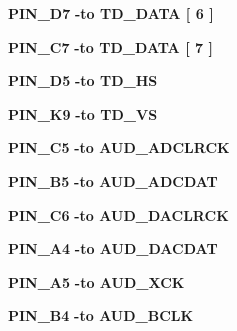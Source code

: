 \begin{DoxyCompactItemize}
\item 
{\bf P\+I\+N\+\_\+\+D7} {\bfseries \textcolor{vhdlchar}{-\/}\textcolor{keywordflow}{to}\textcolor{vhdlchar}{ }\textcolor{vhdlchar}{T\+D\+\_\+\+D\+A\+TA}\textcolor{vhdlchar}{ }\textcolor{vhdlchar}{[}\textcolor{vhdlchar}{ } \textcolor{vhdldigit}{6} \textcolor{vhdlchar}{ }\textcolor{vhdlchar}{]}\textcolor{vhdlchar}{ }} 
\item 
{\bf P\+I\+N\+\_\+\+C7} {\bfseries \textcolor{vhdlchar}{-\/}\textcolor{keywordflow}{to}\textcolor{vhdlchar}{ }\textcolor{vhdlchar}{T\+D\+\_\+\+D\+A\+TA}\textcolor{vhdlchar}{ }\textcolor{vhdlchar}{[}\textcolor{vhdlchar}{ } \textcolor{vhdldigit}{7} \textcolor{vhdlchar}{ }\textcolor{vhdlchar}{]}\textcolor{vhdlchar}{ }} 
\item 
{\bf P\+I\+N\+\_\+\+D5} {\bfseries \textcolor{vhdlchar}{-\/}\textcolor{keywordflow}{to}\textcolor{vhdlchar}{ }\textcolor{vhdlchar}{T\+D\+\_\+\+HS}\textcolor{vhdlchar}{ }} 
\item 
{\bf P\+I\+N\+\_\+\+K9} {\bfseries \textcolor{vhdlchar}{-\/}\textcolor{keywordflow}{to}\textcolor{vhdlchar}{ }\textcolor{vhdlchar}{T\+D\+\_\+\+VS}\textcolor{vhdlchar}{ }} 
\item 
{\bf P\+I\+N\+\_\+\+C5} {\bfseries \textcolor{vhdlchar}{-\/}\textcolor{keywordflow}{to}\textcolor{vhdlchar}{ }\textcolor{vhdlchar}{A\+U\+D\+\_\+\+A\+D\+C\+L\+R\+CK}\textcolor{vhdlchar}{ }} 
\item 
{\bf P\+I\+N\+\_\+\+B5} {\bfseries \textcolor{vhdlchar}{-\/}\textcolor{keywordflow}{to}\textcolor{vhdlchar}{ }\textcolor{vhdlchar}{A\+U\+D\+\_\+\+A\+D\+C\+D\+AT}\textcolor{vhdlchar}{ }} 
\item 
{\bf P\+I\+N\+\_\+\+C6} {\bfseries \textcolor{vhdlchar}{-\/}\textcolor{keywordflow}{to}\textcolor{vhdlchar}{ }\textcolor{vhdlchar}{A\+U\+D\+\_\+\+D\+A\+C\+L\+R\+CK}\textcolor{vhdlchar}{ }} 
\item 
{\bf P\+I\+N\+\_\+\+A4} {\bfseries \textcolor{vhdlchar}{-\/}\textcolor{keywordflow}{to}\textcolor{vhdlchar}{ }\textcolor{vhdlchar}{A\+U\+D\+\_\+\+D\+A\+C\+D\+AT}\textcolor{vhdlchar}{ }} 
\item 
{\bf P\+I\+N\+\_\+\+A5} {\bfseries \textcolor{vhdlchar}{-\/}\textcolor{keywordflow}{to}\textcolor{vhdlchar}{ }\textcolor{vhdlchar}{A\+U\+D\+\_\+\+X\+CK}\textcolor{vhdlchar}{ }} 
\item 
{\bf P\+I\+N\+\_\+\+B4} {\bfseries \textcolor{vhdlchar}{-\/}\textcolor{keywordflow}{to}\textcolor{vhdlchar}{ }\textcolor{vhdlchar}{A\+U\+D\+\_\+\+B\+C\+LK}\textcolor{vhdlchar}{ }} 
\item 

\end{DoxyCompactItemize}
